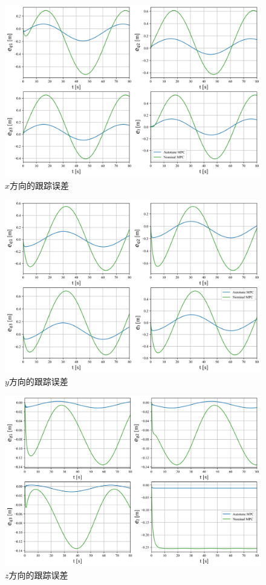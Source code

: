 \documentclass[lang=chs, degree=master, blindreview=true, winfonts=true]{yanputhesis}
\begin{document}
\begin{figure}[hbt!]
	\centering
	\includegraphics[width=38pc]{picture/kk2/ex.png} 
	\caption{$x$方向的跟踪误差} 
	\label{ex}
\end{figure}

\begin{figure}[hbt!]
	\centering
	\includegraphics[width=38pc]{picture/kk2/ey.png} 
	\caption{$y$方向的跟踪误差} 
	\label{ey}
\end{figure}

\begin{figure}[hbt!]
	\centering
	\includegraphics[width=38pc]{picture/kk2/ez.png} 
	\caption{$z$方向的跟踪误差} 
	\label{ez}
\end{figure}
\end{document}
